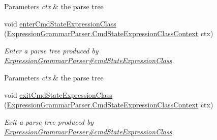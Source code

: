 \begin{DoxyCompactItemize}
\begin{DoxyCompactList}
\begin{DoxyParams}{Parameters}
{\em ctx} & the parse tree\\
\hline
\end{DoxyParams}
 \end{DoxyCompactList}\item 
void \hyperlink{classgov_1_1nasa_1_1jpf_1_1inspector_1_1server_1_1expression_1_1parser_1_1_expression_grammar_base_listener_acac93776a72b43d93243e905f2cb4d9a}{enter\+Cmd\+State\+Expression\+Class} (\hyperlink{classgov_1_1nasa_1_1jpf_1_1inspector_1_1server_1_1expression_1_1parser_1_1_expression_grammar_pa672388ef0800b4a3d173ab7548f6b406}{Expression\+Grammar\+Parser.\+Cmd\+State\+Expression\+Class\+Context} ctx)
\begin{DoxyCompactList}\small\item\em Enter a parse tree produced by \hyperlink{classgov_1_1nasa_1_1jpf_1_1inspector_1_1server_1_1expression_1_1parser_1_1_expression_grammar_parser_a7a61b20a8b2616173f6b566712b279dd}{Expression\+Grammar\+Parser\#cmd\+State\+Expression\+Class}.


\begin{DoxyParams}{Parameters}
{\em ctx} & the parse tree\\
\hline
\end{DoxyParams}
 \end{DoxyCompactList}\item 
void \hyperlink{classgov_1_1nasa_1_1jpf_1_1inspector_1_1server_1_1expression_1_1parser_1_1_expression_grammar_base_listener_aea179d6348a58d1838df4db365542419}{exit\+Cmd\+State\+Expression\+Class} (\hyperlink{classgov_1_1nasa_1_1jpf_1_1inspector_1_1server_1_1expression_1_1parser_1_1_expression_grammar_pa672388ef0800b4a3d173ab7548f6b406}{Expression\+Grammar\+Parser.\+Cmd\+State\+Expression\+Class\+Context} ctx)
\begin{DoxyCompactList}\small\item\em Exit a parse tree produced by \hyperlink{classgov_1_1nasa_1_1jpf_1_1inspector_1_1server_1_1expression_1_1parser_1_1_expression_grammar_parser_a7a61b20a8b2616173f6b566712b279dd}{Expression\+Grammar\+Parser\#cmd\+State\+Expression\+Class}.



\end{DoxyCompactList}
\end{DoxyCompactItemize}
